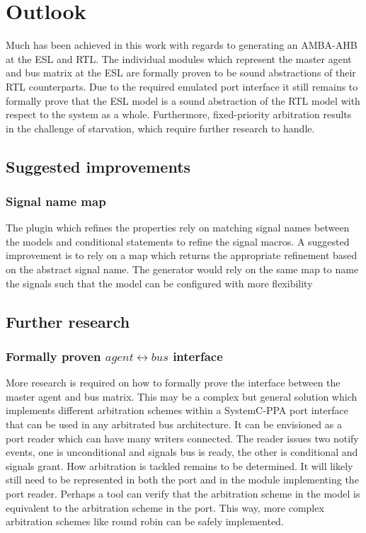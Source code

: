 \section{Outlook}
\label{sec:outl}
Much has been achieved in this work with regards to generating an AMBA-AHB at the ESL and RTL. The individual modules which represent the master agent and bus matrix at the ESL are formally proven to be sound abstractions of their RTL counterparts. Due to the required emulated port interface it still remains to formally prove that the ESL model is a sound abstraction of the RTL model with respect to the system as a whole. Furthermore, fixed-priority arbitration results in the challenge of starvation, which require further research to handle.    

\subsection{Suggested improvements}
\label{sec:impr}
\subsubsection{Signal name map}
The plugin which refines the properties rely on matching signal names between the models and conditional statements to refine the signal macros. A suggested improvement is to rely on a map which returns the appropriate refinement based on the abstract signal name. The generator would rely on the same map to name the signals such that the model can be configured with more flexibility


\subsection{Further research}
\subsubsection{Formally proven $agent\leftrightarrow bus$ interface}
More research is required on how to formally prove the interface between the master agent and bus matrix. This may be a complex but general solution which implements different arbitration schemes within a SystemC-PPA port interface that can be used in any arbitrated bus architecture. It can be envisioned as a port reader which can have many writers connected. The reader issues two notify events, one is unconditional and signals bus is ready, the other is conditional and signals grant. How arbitration is tackled remains to be determined. It will likely still need to be represented in both the port and in the module implementing the port reader. Perhaps a tool can verify that the arbitration scheme in the model is equivalent to the arbitration scheme in the port. This way, more complex arbitration schemes like round robin can be safely implemented.  

